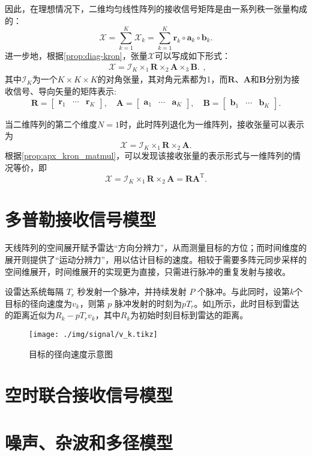 因此，在理想情况下，二维均匀线性阵列的接收信号矩阵是由一系列秩一张量构成的：
\[
    \mathcal{X}
    = \sum_{k=1}^{K} \mathcal{X}_k
    = \sum_{k=1}^{K} \bm{r}_k \circ \bm{a}_k \circ \bm{b}_k.
\]
进一步地，根据\cref{prop:diag-kron}，张量\( \mathcal{X} \)可以写成如下形式：
\[
    \begin{split}
        \mathcal{X} = \mathcal{I}_K \times_1 \mathbf{R} \times_2 \mathbf{A} \times_3 \mathbf{B}.
    \end{split},
\]
其中\( \mathcal{I}_K \)为一个\( K \times K \times K \)的对角张量，其对角元素都为1，而\( \mathbf{R} \)、\( \mathbf{A} \)和\( \mathbf{B} \)分别为接收信号、导向矢量的矩阵表示:
\[
    \mathbf{R} = \begin{bmatrix}
        \bm{r}_1 & \cdots & \bm{r}_K
    \end{bmatrix}, \quad
    \mathbf{A} = \begin{bmatrix}
        \bm{a}_1 & \cdots & \bm{a}_K
    \end{bmatrix}, \quad
    \mathbf{B} = \begin{bmatrix}
        \bm{b}_1 & \cdots & \bm{b}_K
    \end{bmatrix}.
\]

当二维阵列的第二个维度\( N=1 \)时，此时阵列退化为一维阵列，接收张量可以表示为
\[
    \mathcal{X} = \mathcal{I}_K \times_1 \mathbf{R} \times_2 \mathbf{A}.
\]
根据\cref{prop:apx_kron_matmul}，可以发现该接收张量的表示形式与一维阵列的情况等价，即
\[
    \mathcal{X} = \mathcal{I}_K \times_1 \mathbf{R} \times_2 \mathbf{A} = \mathbf{R} \mathbf{A}^{\mathrm{T}}.
\]

\section{多普勒接收信号模型}
天线阵列的空间展开赋予雷达``方向分辨力''，从而测量目标的方位；而时间维度的展开则提供了``运动分辨力''，用以估计目标的速度。相较于需要多阵元同步采样的空间维展开，时间维展开的实现更为直接，只需进行脉冲的重复发射与接收。

设雷达系统每隔 \(T_r\) 秒发射一个脉冲，并持续发射 \(P\) 个脉冲。与此同时，设第\( k \)个目标的径向速度为\( v_k \)，则第 \( p \) 脉冲发射的时刻为\( p T_r \)。如\cref{fig_v_k}所示，此时目标到雷达的距离近似为\( R_k -  p T_r v_k\)，其中\( R_k \)为初始时刻目标到雷达的距离。

\begin{figure}[htb!]
    \centering
    \texttt{[image: ./img/signal/v\_k.tikz]}
    \caption{目标的径向速度示意图}
    \label{fig_v_k}
\end{figure}

\section{空时联合接收信号模型}

\section{噪声、杂波和多径模型}
